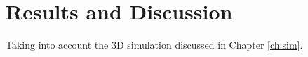 \chapter{Results and Discussion}\label{ch:results}
Taking into account the 3D simulation discussed in Chapter \ref{ch:sim}. 